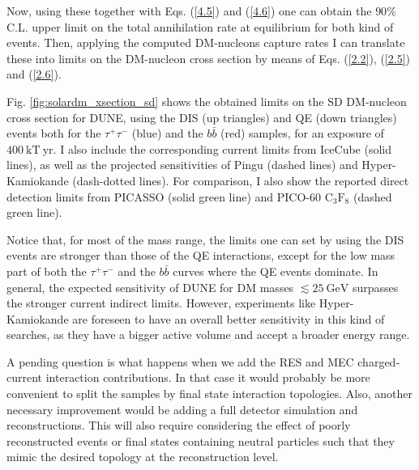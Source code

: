 Now, using these together with Eqs. (\ref{4.5}) and (\ref{4.6}) one can obtain the $90\%$ C.L. upper limit on the total annihilation rate at equilibrium for both kind of events. Then, applying the computed DM-nucleons capture rates I can translate these into limits on the DM-nucleon cross section by means of Eqs. (\ref{2.2}), (\ref{2.5}) and (\ref{2.6}).

Fig. \ref{fig:solardm_xsection_sd} shows the obtained limits on the SD DM-nucleon cross section for DUNE, using the DIS (up triangles) and QE (down triangles) events both for the $\tau^{+}\tau^{-}$ (blue) and the $b\bar{b}$ (red) samples, for an exposure of $400 \ \mathrm{kT} \ \mathrm{yr}$. I also include the corresponding current limits from IceCube \cite{IceCube2021} (solid lines), as well as the projected sensitivities of Pingu \cite{Chen2014} (dashed lines) and Hyper-Kamiokande \cite{Bell2021} (dash-dotted lines). For comparison, I also show the reported direct detection limits from PICASSO \cite{Behnke2016} (solid green line) and PICO-60 $\mathrm{C}_{3}\mathrm{F}_{8}$ \cite{PICO2019} (dashed green line).

Notice that, for most of the mass range, the limits one can set by using the DIS events are stronger than those of the QE interactions, except for the low mass part of both the $\tau^{+}\tau^{-}$ and the $b\bar{b}$ curves where the QE events dominate. In general, the expected sensitivity of DUNE for DM masses $\lesssim 25 \ \mathrm{GeV}$ surpasses the stronger current indirect limits. However, experiments like Hyper-Kamiokande are foreseen to have an overall better sensitivity in this kind of searches, as they have a bigger active volume and accept a broader energy range.

A pending question is what happens when we add the RES and MEC charged-current interaction contributions. In that case it would probably be more convenient to split the samples by final state interaction topologies. Also, another necessary improvement would be adding a full detector simulation and reconstructions. This will also require considering the effect of poorly reconstructed events or final states containing neutral particles such that they mimic the desired topology at the reconstruction level.

